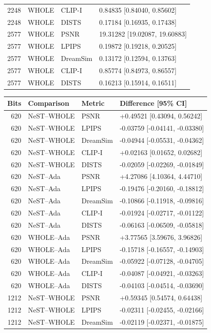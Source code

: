 \documentclass[10pt,letterpaper]{article}
\begin{document}
\begin{longtable}{@{}rlll@{}}
2248 & WHOLE & CLIP-I & 0.84835 [0.84040, 0.85602]\\
2248 & WHOLE & DISTS & 0.17184 [0.16935, 0.17438]\\
2577 & WHOLE & PSNR & 19.31282 [19.02087, 19.60883]\\
2577 & WHOLE & LPIPS & 0.19872 [0.19218, 0.20525]\\
2577 & WHOLE & DreamSim & 0.13172 [0.12594, 0.13763]\\
2577 & WHOLE & CLIP-I & 0.85774 [0.84973, 0.86557]\\
2577 & WHOLE & DISTS & 0.16213 [0.15914, 0.16511]\\
\bottomrule\end{longtable}
\begin{longtable}{@{}rlll@{}}\toprule
Bits & Comparison & Metric & Difference [95\% CI]\\\midrule\endhead
620 & NeST--WHOLE & PSNR & +0.49521 [0.43094, 0.56242]\\
620 & NeST--WHOLE & LPIPS & -0.03759 [-0.04141, -0.03380]\\
620 & NeST--WHOLE & DreamSim & -0.04944 [-0.05531, -0.04362]\\
620 & NeST--WHOLE & CLIP-I & +0.02163 [0.01652, 0.02682]\\
620 & NeST--WHOLE & DISTS & -0.02059 [-0.02269, -0.01849]\\
620 & NeST--Ada & PSNR & +4.27086 [4.10364, 4.44710]\\
620 & NeST--Ada & LPIPS & -0.19476 [-0.20160, -0.18812]\\
620 & NeST--Ada & DreamSim & -0.10866 [-0.11918, -0.09816]\\
620 & NeST--Ada & CLIP-I & -0.01924 [-0.02717, -0.01122]\\
620 & NeST--Ada & DISTS & -0.06163 [-0.06509, -0.05818]\\
620 & WHOLE--Ada & PSNR & +3.77565 [3.59676, 3.96826]\\
620 & WHOLE--Ada & LPIPS & -0.15718 [-0.16557, -0.14903]\\
620 & WHOLE--Ada & DreamSim & -0.05922 [-0.07128, -0.04705]\\
620 & WHOLE--Ada & CLIP-I & -0.04087 [-0.04921, -0.03263]\\
620 & WHOLE--Ada & DISTS & -0.04103 [-0.04514, -0.03690]\\
1212 & NeST--WHOLE & PSNR & +0.59345 [0.54574, 0.64438]\\
1212 & NeST--WHOLE & LPIPS & -0.02311 [-0.02455, -0.02166]\\
1212 & NeST--WHOLE & DreamSim & -0.02119 [-0.02371, -0.01875]\\

\end{longtable}
\end{document}
